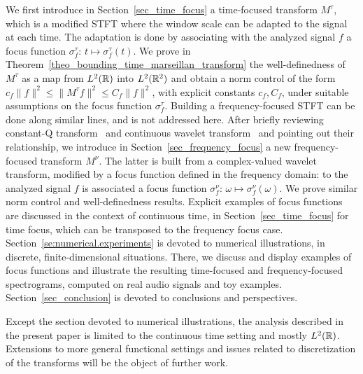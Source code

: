 We first introduce in Section~\ref{sec_time_focus} a time-focused transform $M^\tau$, which is a modified STFT where the window scale can be adapted to the signal at each time. The adaptation is done by associating with the analyzed signal $f$ a focus function $\sigma_f^\tau:\,t\mapsto \sigma^\tau_f(t)$. We prove in Theorem~\ref{theo_bounding_time_marseillan_transform} the well-definedness of $M^\tau$ as a map from $L^2(\mathbb{R})$ into $L^2(\mathbb{R}^2)$ and obtain a norm control of the form $c_f\|f\|^2\le \|M^\tau f\|^2\le C_f\|f\|^2$, with explicit constants $c_f,C_f$, under suitable assumptions on the focus function $\sigma_f^\tau$. Building a frequency-focused STFT can be done along similar lines, and is not addressed here.
After briefly reviewing constant-Q transform~\cite{velasco2011constructing,holighaus2012framework} and continuous wavelet transform~\cite{Grossmann1984decomposition} and pointing out their relationship, we introduce in Section~\ref{sec_frequency_focus} a new frequency-focused transform $M^\nu$. The latter is built from a complex-valued wavelet transform, modified by a focus function defined in the frequency domain: to the analyzed signal $f$ is associated a focus function $\sigma_f^\nu: \,\omega\mapsto\sigma^\nu_f(\omega)$. We prove similar norm control and well-definedness results.
Explicit examples of focus functions are discussed in the context of continuous time, in Section~\ref{sec_time_focus} for time focus, which can be transposed to the frequency focus case. Section~\ref{se:numerical.experiments} is devoted to numerical illustrations, in discrete, finite-dimensional situations. There, we discuss and display examples of focus functions and illustrate the resulting time-focused and frequency-focused spectrograms, computed on real audio signals and toy examples.
Section~\ref{sec_conclusion} is devoted to conclusions and perspectives.

\smallskip
Except the section devoted to numerical illustrations, the analysis described in the present paper is limited to the continuous time setting and mostly $L^2(\mathbb{R})$. Extensions to more general functional settings and issues related to discretization of the transforms will be the object of further work.





